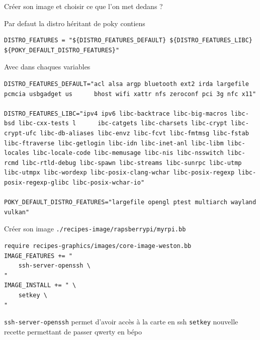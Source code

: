 \documentclass[compress]{smilebeamer}
\begin{document}
\begin{frame}
\begin{center}
\textcolor{smileOrange}{\huge{Créer son image et choisir ce que l'on met dedans ?}}
\end{center}
\end{frame}

\begin{frame}[fragile]
	Par defaut la distro héritant de poky contiens
	\begin{lstlisting}[style=bitbake]
DISTRO_FEATURES = "${DISTRO_FEATURES_DEFAULT} ${DISTRO_FEATURES_LIBC} ${POKY_DEFAULT_DISTRO_FEATURES}"
	\end{lstlisting}
	
\end{frame}

\begin{frame}[fragile]
	Avec dans chaques variables
	\begin{lstlisting}[style=bitbake]
DISTRO_FEATURES_DEFAULT="acl alsa argp bluetooth ext2 irda largefile pcmcia usbgadget us      bhost wifi xattr nfs zeroconf pci 3g nfc x11"
	
DISTRO_FEATURES_LIBC="ipv4 ipv6 libc-backtrace libc-big-macros libc-bsd libc-cxx-tests l      ibc-catgets libc-charsets libc-crypt libc-crypt-ufc libc-db-aliases libc-envz libc-fcvt libc-fmtmsg libc-fstab libc-ftraverse libc-getlogin libc-idn libc-inet-anl libc-libm libc-locales libc-locale-code libc-memusage libc-nis libc-nsswitch libc-rcmd libc-rtld-debug libc-spawn libc-streams libc-sunrpc libc-utmp libc-utmpx libc-wordexp libc-posix-clang-wchar libc-posix-regexp libc-posix-regexp-glibc libc-posix-wchar-io"
	
POKY_DEFAULT_DISTRO_FEATURES="largefile opengl ptest multiarch wayland vulkan"
	\end{lstlisting}
\end{frame}

\begin{frame}[fragile]
Créer son image \texttt{./recipes-image/rapsberrypi/myrpi.bb}
\begin{lstlisting}[style=bitbake]
require recipes-graphics/images/core-image-weston.bb
IMAGE_FEATURES += " 
    ssh-server-openssh \
"
IMAGE_INSTALL += " \
    setkey \
"
\end{lstlisting}
{\color[RGB]{232,120,0}\texttt{ssh-server-openssh}} permet d'avoir accès à la carte en ssh
{\color[RGB]{232,120,0}\texttt{setkey}} nouvelle recette permettant de passer qwerty en bépo
\end{frame}
\end{document}

